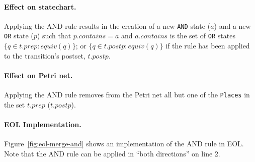 \documentclass[submission,copyright,creativecommons]{eptcs}
\begin{document}
\paragraph{Effect on statechart.} Applying the AND rule results in the creation of a new \texttt{AND} state ($a$) and a new \texttt{OR} state ($p$) such that $p.contains = {a}$ and $a.contains$ is the set of \texttt{OR} states $\{q \in t.prep : equiv(q) \}$; or $\{q \in t.postp : equiv(q) \}$ if the rule has been applied to the transition's postset, $t.postp$.

\paragraph{Effect on Petri net.} Applying the AND rule removes from the Petri net all but one of the \texttt{Places} in the set $t.prep$ ($t.postp$).

\paragraph{EOL Implementation.} Figure~\ref{fig:eol-merge-and} shows an implementation of the AND rule in EOL. Note that the AND rule can be applied in ``both directions'' on line 2.
\end{document}
